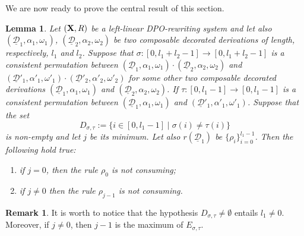 \documentclass[a4paper]{article}
\def\X{\textbf {\textup{X}}}
\newcommand{\dder}[1]{\mathscr{#1}}
\newcommand{\der}[1]{\underline{\dder{#1}}}
\newtheorem{lemma}[theorem]{Lemma}
\theoremstyle{definition}
\newtheorem{remark}[theorem]{Remark}
\begin{document}
We are now ready to prove the central result of this section. 
\begin{lemma}\label{lem:impo}
	Let $(\X,R)$ be a left-linear DPO-rewriting system and let also $(\der{D}_1, \alpha_1, \omega_1)$, $(\der{D}_2, \alpha_2, \omega_2)$ be two composable decorated derivations of length, respectively, $l_1$ and $l_2$. Suppose that $\sigma:[0, l_1+l_2-1]\to [0, l_1+l_2-1]$ is a consistent permutation between $(\der{D}_1, \alpha_1, \omega_1)\cdot (\der{D}_2, \alpha_2, \omega_2)$ and $(\der{D}'_1, \alpha'_1, \omega'_1)\cdot (\der{D}'_2, \alpha'_2, \omega'_2)$ for some other two composable decorated derivations $(\der{D}_1, \alpha_1, \omega_1)$ and $(\der{D}_2, \alpha_2, \omega_2)$.  If $\tau:[0,l_1-1]\to [0, l_1-1]$ is a consistent permutation between $(\der{D}_1, \alpha_1, \omega_1)$ and $(\der{D}'_1, \alpha'_1, \omega'_1)$. Suppose that  the set 
	\[D_{\sigma, \tau}:=\{i\in [0, l_1-1]\mid \sigma(i)\neq \tau(i)\}\]
	is non-empty and let $j$ be its minimum. Let also $r(\der{D}_1)$ be $\{\rho_i\}_{i=0}^{l_1-1}$. Then the following hold true:
	\begin{enumerate}
		\item if $j=0$, then the rule $\rho_0$ is not consuming;
		\item if $j\neq 0$ then the rule $\rho_{j-1}$ is not consuming.
	\end{enumerate}
\end{lemma}
\begin{remark}\label{rem:minmax}It is worth to notice that the hypothesis $D_{\sigma, \tau} \neq \emptyset$ entails $l_1\neq 0$. Moreover, if $j\neq 0$, then $j-1$ is the maximum of $E_{\sigma, \tau}$.
\end{remark}
\end{document}
